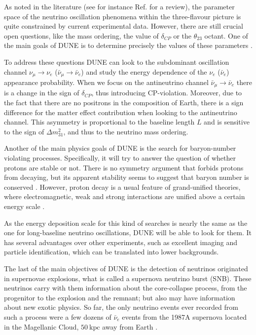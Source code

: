 As noted in the literature (see for instance Ref. \cite{deSalas2020} for a review), the parameter space of the neutrino oscillation phenomena within the three-flavour picture is quite constrained by current experimental data. However, there are still crucial open questions, like the mass ordering, the value of $\delta_{CP}$ or the $\theta_{23}$ octant. One of the main goals of DUNE is to determine precisely the values of these parameters \cite{DUNE2020TDR2}.

To address these questions DUNE can look to the subdominant oscillation channel $\nu_{\mu} \rightarrow \nu_{e}$ ($\bar{\nu}_{\mu} \rightarrow \bar{\nu}_{e}$) and study the energy dependence of the $\nu_{e}$ ($\bar{\nu}_{e}$) appearance probability. When we focus on the antineutrino channel $\bar{\nu}_{\mu} \rightarrow \bar{\nu}_{e}$ there is a change in the sign of $\delta_{CP}$, thus introducing CP-violation. Moreover, due to the fact that there are no positrons in the composition of Earth, there is a sign difference for the matter effect contribution when looking to the antineutrino channel. This asymmetry is proportional to the baseline length $L$ and is sensitive to the sign of $\Delta m^{2}_{31}$, and thus to the neutrino mass ordering.

Another of the main physics goals of DUNE is the search for baryon-number violating processes. Specifically, it will try to answer the question of whether protons are stable or not. There is no symmetry argument that forbids protons from decaying, but its apparent stability seems to suggest that baryon number is conserved \cite{Super-Kamiokande2009}. However, proton decay is a usual feature of grand-unified theories, where electromagnetic, weak and strong interactions are unified above a certain energy scale \cite{Raby2006}.

As the energy deposition scale for this kind of searches is nearly the same as the one for long-baseline neutrino oscillations, DUNE will be able to look for them. It has several advantages over other experiments, such as excellent imaging and particle identification, which can be translated into lower backgrounds.

The last of the main objectives of DUNE is the detection of neutrinos originated in supernovae explosions, what is called a supernova neutrino burst (SNB). These neutrinos carry with them information about the core-collapse process, from the progenitor to the explosion and the remnant; but also may have information about new exotic physics. So far, the only neutrino events ever recorded from such a process were a few dozens of $\bar{\nu}_{e}$ events from the 1987A supernova located in the Magellanic Cloud, $50~\mathrm{kpc}$ away from Earth \cite{Kamiokande-II1987, Bionta1987}.

